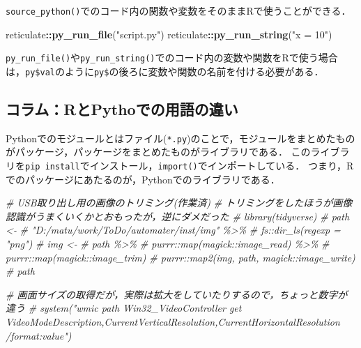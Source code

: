 \documentclass[
]{article}
\newenvironment{Shaded}{\begin{snugshade}}{\end{snugshade}}
\newcommand{\CommentTok}[1]{\textcolor[rgb]{0.56,0.35,0.01}{\textit{#1}}}
\newcommand{\FunctionTok}[1]{\textcolor[rgb]{0.13,0.29,0.53}{\textbf{#1}}}
\newcommand{\NormalTok}[1]{#1}
\newcommand{\SpecialCharTok}[1]{\textcolor[rgb]{0.81,0.36,0.00}{\textbf{#1}}}
\newcommand{\StringTok}[1]{\textcolor[rgb]{0.31,0.60,0.02}{#1}}
\begin{document}
\texttt{source\_python()}でのコード内の関数や変数をそのままRで使うことができる．

\begin{Shaded}
\begin{Highlighting}[]
\NormalTok{reticulate}\SpecialCharTok{::}\FunctionTok{py\_run\_file}\NormalTok{(}\StringTok{"script.py"}\NormalTok{)}
\NormalTok{reticulate}\SpecialCharTok{::}\FunctionTok{py\_run\_string}\NormalTok{(}\StringTok{"x = 10"}\NormalTok{)}
\end{Highlighting}
\end{Shaded}

\texttt{py\_run\_file()}や\texttt{py\_run\_string()}でのコード内の変数や関数をRで使う場合は，\texttt{py\$val}のように\texttt{py\$}の後ろに変数や関数の名前を付ける必要がある．

\hypertarget{ux30b3ux30e9ux30e0rux3068pythoux3067ux306eux7528ux8a9eux306eux9055ux3044}{%
\subsection{コラム：RとPythoでの用語の違い}\label{ux30b3ux30e9ux30e0rux3068pythoux3067ux306eux7528ux8a9eux306eux9055ux3044}}

Pythonでのモジュールとはファイル(\texttt{*.py})のことで，モジュールをまとめたものがパッケージ，パッケージをまとめたものがライブラリである．
このライブラリを\texttt{pip\ install}でインストール，\texttt{import()}でインポートしている．
つまり，Rでのパッケージにあたるのが，Pythonでのライブラリである．

\begin{Shaded}
\begin{Highlighting}[]
  \CommentTok{\# USB取り出し用の画像のトリミング(作業済)}
  \CommentTok{\#   トリミングをしたほうが画像認識がうまくいくかとおもったが，逆にダメだった}
  \CommentTok{\# library(tidyverse)}
  \CommentTok{\# path \textless{}{-} }
  \CommentTok{\#   "D:/matu/work/ToDo/automater/inst/img" \%\textgreater{}\%}
  \CommentTok{\#   fs::dir\_ls(regexp = "png") }
  \CommentTok{\# img \textless{}{-} }
  \CommentTok{\#   path \%\textgreater{}\%}
  \CommentTok{\#   purrr::map(magick::image\_read) \%\textgreater{}\%}
  \CommentTok{\#   purrr::map(magick::image\_trim)}
  \CommentTok{\# purrr::map2(img, path, magick::image\_write)}
  \CommentTok{\# path}
\end{Highlighting}
\end{Shaded}

\begin{Shaded}
\begin{Highlighting}[]
  \CommentTok{\# 画面サイズの取得だが，実際は拡大をしていたりするので，ちょっと数字が違う}
  \CommentTok{\# system("wmic path Win32\_VideoController get VideoModeDescription,CurrentVerticalResolution,CurrentHorizontalResolution /format:value")}
\end{Highlighting}
\end{Shaded}
\end{document}
